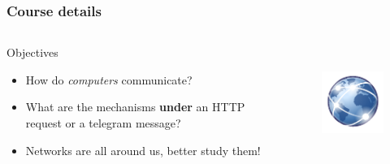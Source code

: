   \begin{frame}
    \frametitle{Course details}
    \begin{columns}
        \begin{block}{Objectives}
          \begin{itemize}
            \item How do \emph{computers} communicate?
            \item What are the mechanisms \textbf{under} an HTTP request or a telegram message?
            \item Networks are all around us, better study them!
          \end{itemize}
        \end{block}
        \begin{figure}[t]
          \centering
          \includegraphics[height=3cm]{./imgs/ntwks.pdf}
          \label{fig:ntwks}
        \end{figure}
    \end{columns}
  \end{frame}

